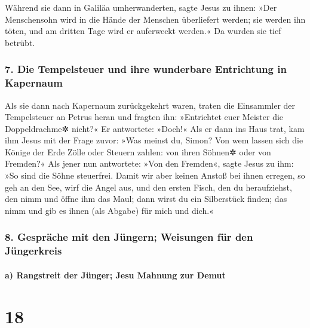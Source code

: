  Während sie dann in Galiläa umherwanderten, sagte Jesus
zu ihnen: »Der Menschensohn wird in die Hände der Menschen überliefert
werden;  sie werden ihn töten, und am dritten Tage wird
er auferweckt werden.« Da wurden sie tief betrübt.

\hypertarget{die-tempelsteuer-und-ihre-wunderbare-entrichtung-in-kapernaum}{%
\subsubsection{7. Die Tempelsteuer und ihre wunderbare Entrichtung in
Kapernaum}\label{die-tempelsteuer-und-ihre-wunderbare-entrichtung-in-kapernaum}}

 Als sie dann nach Kapernaum zurückgekehrt waren, traten
die Einsammler der Tempelsteuer an Petrus heran und fragten ihn:
»Entrichtet euer Meister die Doppeldrachme✲ nicht?«  Er
antwortete: »Doch!« Als er dann ins Haus trat, kam ihm Jesus mit der
Frage zuvor: »Was meinst du, Simon? Von wem lassen sich die Könige der
Erde Zölle oder Steuern zahlen: von ihren Söhnen✲ oder von Fremden?«
 Als jener nun antwortete: »Von den Fremden«, sagte Jesus
zu ihm: »So sind die Söhne steuerfrei.  Damit wir aber
keinen Anstoß bei ihnen erregen, so geh an den See, wirf die Angel aus,
und den ersten Fisch, den du heraufziehst, den nimm und öffne ihm das
Maul; dann wirst du ein Silberstück finden; das nimm und gib es ihnen
(als Abgabe) für mich und dich.«

\hypertarget{gespruxe4che-mit-den-juxfcngern-weisungen-fuxfcr-den-juxfcngerkreis}{%
\subsubsection{8. Gespräche mit den Jüngern; Weisungen für den
Jüngerkreis}\label{gespruxe4che-mit-den-juxfcngern-weisungen-fuxfcr-den-juxfcngerkreis}}

\hypertarget{a-rangstreit-der-juxfcnger-jesu-mahnung-zur-demut}{%
\paragraph{a) Rangstreit der Jünger; Jesu Mahnung zur
Demut}\label{a-rangstreit-der-juxfcnger-jesu-mahnung-zur-demut}}

\hypertarget{section-17}{%
\section{18}\label{section-17}}

